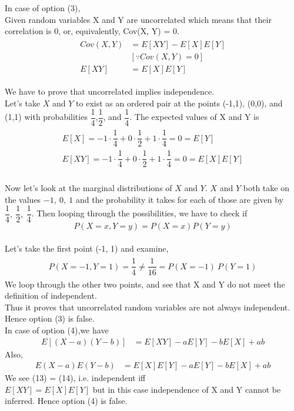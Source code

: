 \documentclass[journal,12pt,twocolumn]{IEEEtran}
\begin{document}
In case of option (3),\\
Given random variables X and Y are uncorrelated which means that their correlation is 0, or, equivalently, Cov(X, Y) = 0.\\
\begin{align}\tag{10}
    \begin{split}
        Cov(X, Y) &= E[XY] - E[X]E[Y]\\
        &[\because Cov(X, Y) = 0]\\
        E[XY] &= E[X]E[Y]
    \end{split}
\end{align}

We have to prove that uncorrelated implies independence.\\
Let’s take $X$ and $Y$ to exist as an ordered pair at the points (-1,1), (0,0), and (1,1) with probabilities $\dfrac{1}{4}$,$\dfrac{1}{2}$, and $\dfrac{1}{4}$. The expected values of X and Y is\\
\begin{align}\tag{11}
    \begin{split}
        E[X] = -1\cdot\dfrac{1}{4} + 0\cdot\dfrac{1}{2} + 1\cdot\dfrac{1}{4} = 0 = E[Y]\\
        E[XY] = -1\cdot\dfrac{1}{4} + 0\cdot\dfrac{1}{2} + 1\cdot\dfrac{1}{4} = 0 = E[X]E[Y]
    \end{split}
\end{align}\\

Now let's look at the marginal distributions of $X$ and $Y$. $X$ and $Y$ both take on the values $-1,\ 0,\ 1$ and the probability it takes for each of those are given by $\dfrac{1}{4},\ \dfrac{1}{2},\ \dfrac{1}{4}$. Then looping through the possibilities, we have to check if $$P(X=x, Y=y) = P(X=x) P(Y=y)$$\\
Let's take the first point (-1, 1) and examine,\\
\begin{align}\tag{12}
    \begin{split}
        P(X=-1, Y=1) = \dfrac{1}{4} \ne \dfrac{1}{16} = P(X=-1)\ P(Y=1)
    \end{split}
\end{align}
We loop through the other two points, and see that X and Y do not meet the definition of independent.\\
Thus it proves that uncorrelated random variables are not always independent. Hence option (3) is false.\\

In case of option (4),we have
\begin{align}\tag{13}
    E[(X-a)(Y-b)] &= E[XY] - aE[Y] - bE[X] + ab
\end{align}
Also,
\begin{align}\tag{14}
    E(X-a) E(Y-b) &= E[X]E[Y] - aE[Y] - bE[X] + ab
\end{align}
We see (13) = (14), i.e. independent iff\\
$E[XY] = E[X] E[Y]$ but in this case independence of X and Y cannot be inferred. Hence option (4) is false.
\end{document}
